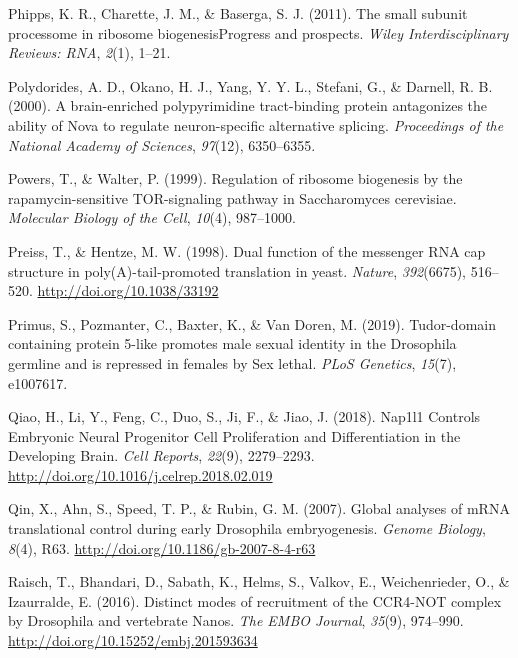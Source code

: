 \documentclass[12pt,oneside]{reedthesis}
\newlength{\cslhangindent}
\newenvironment{cslreferences}%
  {\setlength{\parindent}{0pt}%
  \everypar{\setlength{\hangindent}{\cslhangindent}}\ignorespaces}%
  {\par}
\begin{document}
\begin{cslreferences}
\leavevmode\hypertarget{ref-Phipps2011a}{}%
Phipps, K. R., Charette, J. M., \& Baserga, S. J. (2011). The small subunit processome in ribosome biogenesisProgress and prospects. \emph{Wiley Interdisciplinary Reviews: RNA}, \emph{2}(1), 1--21.

\leavevmode\hypertarget{ref-Polydorides2000}{}%
Polydorides, A. D., Okano, H. J., Yang, Y. Y. L., Stefani, G., \& Darnell, R. B. (2000). A brain-enriched polypyrimidine tract-binding protein antagonizes the ability of Nova to regulate neuron-specific alternative splicing. \emph{Proceedings of the National Academy of Sciences}, \emph{97}(12), 6350--6355.

\leavevmode\hypertarget{ref-powersRegulationRibosomeBiogenesis1999}{}%
Powers, T., \& Walter, P. (1999). Regulation of ribosome biogenesis by the rapamycin-sensitive TOR-signaling pathway in Saccharomyces cerevisiae. \emph{Molecular Biology of the Cell}, \emph{10}(4), 987--1000.

\leavevmode\hypertarget{ref-Preiss1998g}{}%
Preiss, T., \& Hentze, M. W. (1998). Dual function of the messenger RNA cap structure in poly(A)-tail-promoted translation in yeast. \emph{Nature}, \emph{392}(6675), 516--520. \url{http://doi.org/10.1038/33192}

\leavevmode\hypertarget{ref-Primus2019}{}%
Primus, S., Pozmanter, C., Baxter, K., \& Van Doren, M. (2019). Tudor-domain containing protein 5-like promotes male sexual identity in the Drosophila germline and is repressed in females by Sex lethal. \emph{PLoS Genetics}, \emph{15}(7), e1007617.

\leavevmode\hypertarget{ref-qiaoNap1l1ControlsEmbryonic2018}{}%
Qiao, H., Li, Y., Feng, C., Duo, S., Ji, F., \& Jiao, J. (2018). Nap1l1 Controls Embryonic Neural Progenitor Cell Proliferation and Differentiation in the Developing Brain. \emph{Cell Reports}, \emph{22}(9), 2279--2293. \url{http://doi.org/10.1016/j.celrep.2018.02.019}

\leavevmode\hypertarget{ref-qinGlobalAnalysesMRNA2007a}{}%
Qin, X., Ahn, S., Speed, T. P., \& Rubin, G. M. (2007). Global analyses of mRNA translational control during early Drosophila embryogenesis. \emph{Genome Biology}, \emph{8}(4), R63. \url{http://doi.org/10.1186/gb-2007-8-4-r63}

\leavevmode\hypertarget{ref-Raisch2016h}{}%
Raisch, T., Bhandari, D., Sabath, K., Helms, S., Valkov, E., Weichenrieder, O., \& Izaurralde, E. (2016). Distinct modes of recruitment of the CCR4-NOT complex by Drosophila and vertebrate Nanos. \emph{The EMBO Journal}, \emph{35}(9), 974--990. \url{http://doi.org/10.15252/embj.201593634}


\end{cslreferences}
\end{document}

